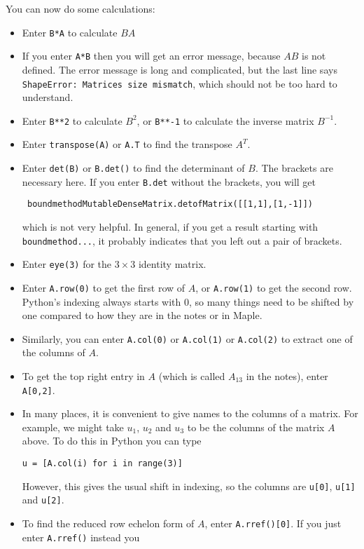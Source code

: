 \documentclass{amsart}
\begin{document}
You can now do some calculations:
\begin{itemize}
 \item Enter \verb|B*A| to calculate $BA$
 \item If you enter \verb|A*B| then you will get an error message,
  because $AB$ is not defined.  The error message is long and
  complicated, but the last line says
  \verb|ShapeError: Matrices size mismatch|, which should not be too
  hard to understand.
 \item Enter \verb|B**2| to calculate $B^2$, or \verb|B**-1| to
  calculate the inverse matrix $B^{-1}$.
 \item Enter \verb|transpose(A)| or \verb|A.T| to find the transpose
  $A^T$.
 \item Enter \verb|det(B)| or \verb|B.det()| to find the determinant
  of $B$.  The brackets are necessary here.  If you enter \verb|B.det|
  without the brackets, you will get 
\begin{verbatim}
 boundmethodMutableDenseMatrix.detofMatrix([[1,1],[1,-1]])
\end{verbatim}
  which is not very helpful.  In general, if you get a result starting
  with \verb|boundmethod...|, it probably indicates that you left out
  a pair of brackets.  
 \item Enter \verb|eye(3)| for the $3\times 3$ identity matrix.
 \item Enter \verb|A.row(0)| to get the first row of $A$, or
  \verb|A.row(1)| to get the second row.  Python's indexing always
  starts with 0, so many things need to be shifted by one compared to
  how they are in the notes or in Maple.
 \item Similarly, you can enter \verb|A.col(0)| or \verb|A.col(1)| or
  \verb|A.col(2)| to extract one of the columns of $A$.
 \item To get the top right entry in $A$ (which is called $A_{13}$ in
  the notes), enter \verb|A[0,2]|.
 \item In many places, it is convenient to give names to the columns
  of a matrix.  For example, we might take $u_1$, $u_2$ and $u_3$ to
  be the columns of the matrix $A$ above.  To do this in Python you can
  type 
\begin{verbatim}
u = [A.col(i) for i in range(3)]
\end{verbatim}
  However, this gives the usual shift in indexing, so the columns are
  \verb|u[0]|, \verb|u[1]| and \verb|u[2]|.
 \item To find the reduced row echelon form of $A$, enter
  \verb|A.rref()[0]|.  If you just enter \verb|A.rref()| instead you

\end{itemize}
\end{document}
